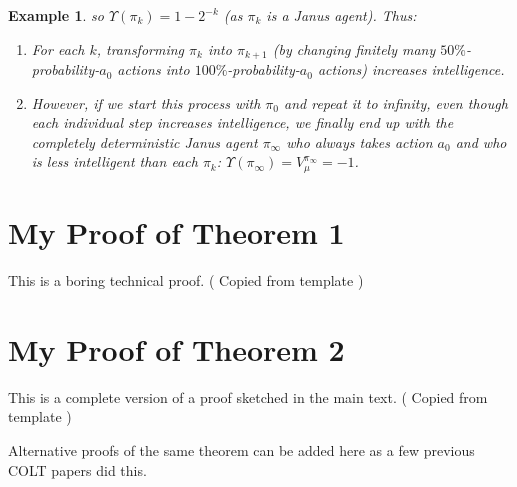 \documentclass[twoside]{article}
\newtheorem{example}[theorem]{Example}
\begin{document}
\begin{example}
    so $\Upsilon(\pi_k)=1-2^{-k}$ (as $\pi_k$ is a Janus agent).
    Thus:
    \begin{enumerate}
        \item For each $k$, transforming $\pi_k$ into $\pi_{k+1}$
            (by changing finitely many $50\%$-probability-$a_0$
            actions into $100\%$-probability-$a_0$ actions)
            \emph{increases} intelligence.
        \item However, if we start this process with $\pi_0$ and
            repeat it to infinity, even though each individual step
            \emph{increases} intelligence, we finally end up with
            the completely deterministic
            Janus agent $\pi_{\infty}$ who always takes action $a_0$ and who is
            \emph{less} intelligent than each $\pi_k$:
            $\Upsilon(\pi_{\infty})=V^{\pi_\infty}_\mu=-1$.
    \end{enumerate}
\end{example}



\appendix

\section{My Proof of Theorem 1}

This is a boring technical proof. ( Copied from template )

\section{My Proof of Theorem 2}

This is a complete version of a proof sketched in the main text.
( Copied from template )

 Alternative proofs of the same theorem can be added here as a few previous COLT papers did this.
\end{document}
